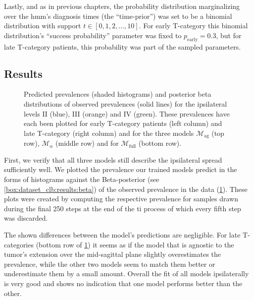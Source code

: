 \documentclass[\relativeRoot/main.tex]{subfiles}
\begin{document}
Lastly, and as in previous chapters, the probability distribution marginalizing over the \gls{hmm}'s diagnosis times (the ``time-prior'') was set to be a binomial distribution with support $t \in [0, 1, 2, \ldots, 10]$. For early T-category this binomial distribution's ``success probability'' parameter was fixed to $p_\text{early} = 0.3$, but for late T-category patients, this probability was part of the sampled parameters.

\subsection{Results}
\label{subsec:bilateral:model_comp:results}

\begin{figure}
    \def\svgwidth{1.0\textwidth}
    
    \caption[
        Comparison of ipsilateral prevalences
    ]{
        Predicted prevalences (shaded histograms) and posterior beta distributions of observed prevalences (solid lines) for the ipsilateral levels II (blue), III (orange) and IV (green). These prevalences have each been plotted for early T-category patients (left column) and late T-category (right column) and for the three models $\mathcal{M}_\text{ag}$ (top row), $\mathcal{M}_\alpha$ (middle row) and for $\mathcal{M}_\text{full}$ (bottom row).
    }
    \label{fig:bilateral:model_comp:ipsi}
\end{figure}

First, we verify that all three models still describe the ipsilateral spread sufficiently well. We plotted the prevalence our trained models predict in the forms of histograms against the Beta-posterior (see \cref{box:dataset_clb:results:beta}) of the observed prevalence in the data (\cref{fig:bilateral:model_comp:ipsi}). These plots were created by computing the respective prevalence for samples drawn during the final 250 steps at the end of the \gls{ti} process of which every fifth step was discarded.

The shown differences between the model's predictions are negligible. For late T-categories (bottom row of \cref{fig:bilateral:model_comp:ipsi}) it seems as if the model that is agnostic to the tumor's extension over the mid-sagittal plane slightly overestimates the prevalence, while the other two models seem to match them better or underestimate them by a small amount. Overall the fit of all models ipsilaterally is very good and shows no indication that one model performs better than the other.
\end{document}
